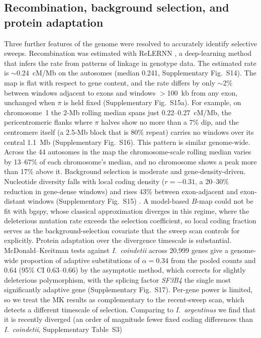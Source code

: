 \documentclass[11pt]{article}
\newcommand{\coin}{\textit{I.\ coindetii}}
\begin{document}
\subsection{Recombination, background selection, and protein adaptation}
Three further features of the genome were resolved to accurately identify selective sweeps. Recombination 
was estimated with ReLERNN \citep{adrion2020relernn}, a deep-learning method that infers the rate from patterns of linkage in genotype data. The estimated rate is $\sim$0.24~cM/Mb on the 
autosomes (median 0.241, Supplementary Fig.~S14). The map is flat with respect to gene content, 
and the rate differs by only $\sim$2\% between windows adjacent to exons and windows $>$100~kb from any exon, unchanged 
when $\pi$ is held fixed (Supplementary Fig.~S15a). For example, on chromosome~1 the 2-Mb rolling median spans just 0.22--0.27~cM/Mb, 
the pericentromeric flanks where $\pi$ halves show no more than a 7\% dip, and the centromere itself 
(a 2.5-Mb block that is 80\% repeat) carries no windows over its central 1.1~Mb (Supplementary Fig.~S16). 
This pattern is similar genome-wide. Across the 44 autosomes in the map the chromosome-scale rolling median 
varies by 13--67\% of each chromosome's median, and no chromosome shows a peak more than 17\% above it. 
Background selection is moderate and gene-density-driven. Nucleotide diversity falls with local coding density
($r=-0.31$, a 20--30\% reduction in gene-dense windows) and rises 43\% between exon-adjacent and exon-distant
windows (Supplementary Fig.~S15) \citep{charlesworth1993,mcvicker2009,charlesworth2021}. A model-based $B$-map could not be fit with bgspy, whose classical approximation diverges in this regime, where the deleterious mutation rate exceeds the selection coefficient, so local coding fraction serves as the background-selection 
covariate that the sweep scan controls for explicitly. Protein adaptation over the divergence timescale
is substantial. McDonald--Kreitman tests \citep{mcdonald1991,messer2013mk} against \coin{} across 20{,}999 genes give a
genome-wide proportion of adaptive substitutions of $\alpha=0.34$ from the pooled counts and 0.64 (95\% CI
0.63--0.66) by the asymptotic method, which corrects for slightly deleterious polymorphism, with the splicing factor
\textit{SF3B4} the single most significantly adaptive gene (Supplementary Fig.~S17). Per-gene power is limited,
so we treat the MK results as complementary to the recent-sweep scan, which detects a different timescale of 
selection. Comparing to \textit{I.\ argentinus} we find that it is recently diverged (an order of magnitude fewer fixed coding differences than \coin{}, Supplementary Table~S3) 
\end{document}
